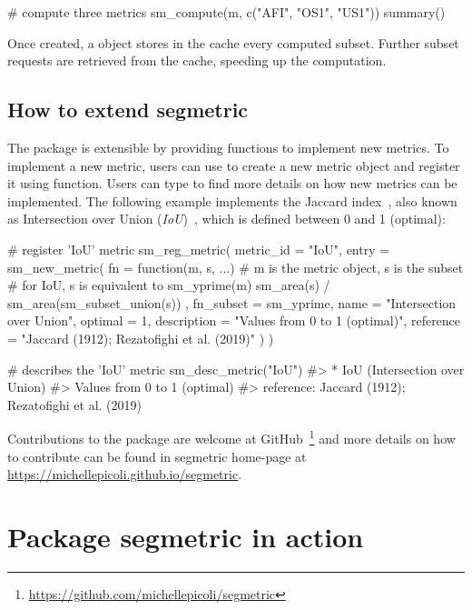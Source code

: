 \begin{example}
# compute three metrics
sm_compute(m, c("AFI", "OS1", "US1")) %
  summary()
\end{example}

Once created, a  object stores in the cache every computed subset. Further subset requests are retrieved from the cache, speeding up the computation.

\subsection{How to extend segmetric}

The  package is extensible by providing functions to implement new metrics. To implement a new metric, users can use  to create a new metric object and register it using  function. Users can type  to find more details on how new metrics can be implemented. The following example implements the Jaccard index~\citep{Jaccard1912}, also known as Intersection over Union (\textit{IoU})~\citep{Rezatofighi2019}, which is defined between 0 and 1 (optimal):

\begin{example}
# register 'IoU' metric
sm_reg_metric(
    metric_id = "IoU",
    entry = sm_new_metric(
        fn = function(m, s, ...) {
            # m is the metric object, s is the subset
            #  for IoU, s is equivalent to sm_yprime(m)
            sm_area(s) / sm_area(sm_subset_union(s))
        },
        fn_subset = sm_yprime,
        name = "Intersection over Union",
        optimal = 1,
        description = "Values from 0 to 1 (optimal)",
        reference = "Jaccard (1912); Rezatofighi et al. (2019)"
    )
)

# describes the 'IoU' metric
sm_desc_metric("IoU")
#> * IoU (Intersection over Union)
#>   Values from 0 to 1 (optimal)
#>   reference: Jaccard (1912); Rezatofighi et al. (2019)
\end{example}

Contributions to the package are welcome at GitHub~\footnote{\url{https://github.com/michellepicoli/segmetric}} and more details on how to contribute can be found in segmetric home-page at \url{https://michellepicoli.github.io/segmetric}.


\section{Package segmetric in action}


